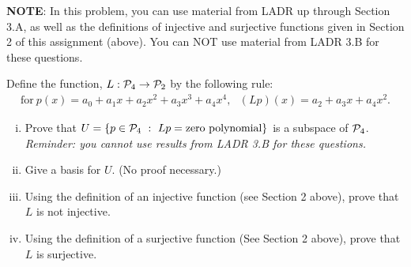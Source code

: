 \begin{question} \noindent \textbf{NOTE}: In this problem, you can use material from LADR up through Section 3.A, as well as the definitions of injective and surjective functions given in Section 2 of this assignment (above). You can NOT use material from LADR 3.B for these questions. \\

	\normalfont
	
	Define the function, $L:\P_4\to \P_2$ by the following rule:
	\begin{align*}
		\text{for}\ p(x) = a_0 + a_1x + a_2x^2 + a_3x^3 + a_4 x^4,\ \ \ 
		(Lp)(x) = a_2 + a_3 x + a_4 x^2. 
	\end{align*}

	
	\begin{enumerate}[(i)]
		
		\item Prove that $U=\{p\in\P_4\ :\ Lp = \text{zero polynomial}\}$ is a subspace of $\P_4$. \\
		\emph{Reminder: you cannot use results from LADR 3.B for these questions.}
		
		\item Give a basis for $U$. (No proof necessary.)
		
		\item Using the definition of an injective function (see Section 2 above), prove that $L$ is not injective.  
				
		\item Using the definition of a surjective function (See Section 2 above), prove that $L$ is surjective.  
	\end{enumerate}
\end{question}